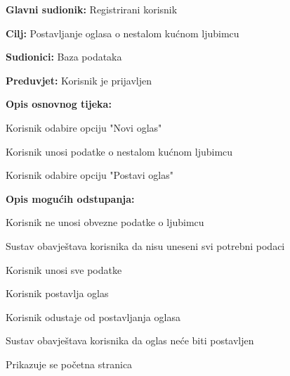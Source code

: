 \noindent {}
\begin{packed_item}
	
	\item \textbf{Glavni sudionik: }Registrirani korisnik
	\item  \textbf{Cilj:} Postavljanje oglasa o nestalom kućnom ljubimcu
	\item  \textbf{Sudionici:} Baza podataka
	\item  \textbf{Preduvjet:} Korisnik je prijavljen
	\item  \textbf{Opis osnovnog tijeka:}
	
	\item[] \begin{packed_enum}
		
		\item Korisnik odabire opciju "Novi oglas"
		\item Korisnik unosi podatke o nestalom kućnom ljubimcu
		\item Korisnik odabire opciju "Postavi oglas"
	\end{packed_enum}
	
	\item  \textbf{Opis mogućih odstupanja:}
	
	\item[] \begin{packed_item}
		
		\item[3.a] Korisnik ne unosi obvezne podatke o ljubimcu
		\item[] \begin{packed_enum}
			
			\item Sustav obavještava korisnika da nisu uneseni svi potrebni podaci
			\item Korisnik unosi sve podatke
			\item Korisnik postavlja oglas
		
		
			\end{packed_enum}
			
			
		\item[3.b] Korisnik odustaje od postavljanja oglasa
		\item[] \begin{packed_enum}
			\item Sustav obavještava korisnika da oglas neće biti postavljen
			\item Prikazuje se početna stranica
		\end{packed_enum}
		
		
	\end{packed_item}
\end{packed_item}

